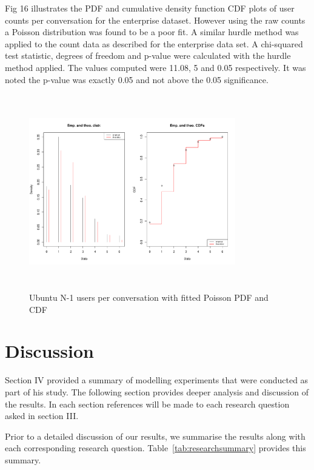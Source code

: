 \documentclass[conference]{IEEEtran}
\begin{document}
Fig 16 illustrates the PDF and cumulative density function CDF  plots of user counts per conversation for the enterprise dataset. However using the raw counts a Poisson distribution was found to be a poor fit. A similar hurdle method was applied to the count data as described for the enterprise data set. A chi-squared test statistic, degrees of freedom and p-value were calculated with the hurdle method applied. The values computed were 11.08, 5 and 0.05 respectively. It was noted the p-value was exactly 0.05 and not above the 0.05 significance.



\begin{figure}
\begin{center}
\includegraphics[height=8.5cm, width=9cm]{16_users_ubuntu.pdf} 
\caption{Ubuntu N-1 users per conversation with fitted Poisson PDF and CDF}
\end{center}
\label{fig:interarrival_ent}
\end{figure}

\section{Discussion}

Section IV provided a summary of modelling experiments that were conducted as part of his study. The following section provides deeper analysis and discussion of the results. In each section references will be made to each research question asked in section III.

Prior to a detailed discussion of our results, we summarise the results along with each corresponding research question. Table~\ref{tab:researchsummary} provides this summary.
\end{document}
